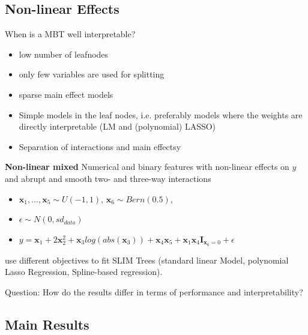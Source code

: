 \subsection{Non-linear Effects}
When is a MBT well interpretable?
\begin{itemize}
    \item low number of leafnodes
    \item only few variables are used for splitting
    \item sparse main effect models
    \item Simple models in the leaf nodes, i.e. preferably models where the weights are directly interpretable (LM and (polynomial) LASSO)
    \item Separation of interactions and main effectsy
\end{itemize}
\textbf{Non-linear mixed}
Numerical and binary features with non-linear effects on $y$ and abrupt and smooth two- and three-way interactions
\begin{itemize}
    \item $\textbf{x}_1, ..., \textbf{x}_5 \sim U(-1,1)$, $\textbf{x}_6 \sim Bern(0.5)$,  
    \item $\epsilon \sim N(0, sd_{data})$
    \item $y = \textbf{x}_1 + 2 \textbf{x}_2^2 + \textbf{x}_3log(abs(\textbf{x}_3)) + \textbf{x}_4\textbf{x}_5 + \textbf{x}_1\textbf{x}_4\mathbf{I}_{\textbf{x}_6 = 0}+ \epsilon$
\end{itemize}
use different objectives to fit SLIM Trees (standard linear Model, polynomial Lasso Regression, Spline-based regression).

Question: How do the results differ in terms of performance and interpretability?






\subsection{Main Results}
